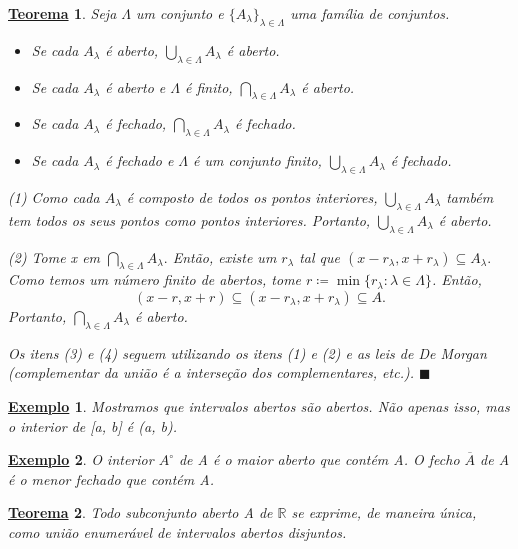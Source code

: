 \documentclass{article}
\newtheorem*{theorem*}{\underline{Teorema}}
\newtheorem{example}{\underline{Exemplo}}
\renewcommand\qedsymbol{$\blacksquare$}
\begin{document}
\begin{theorem*}
  Seja $\Lambda $ um conjunto e $\{A_{\lambda }\}_{\lambda \in\Lambda } $ uma fam\'ilia de conjuntos.
 \begin{itemize}
  \item[1)] Se cada $A_{\lambda }$ \'e aberto, $\bigcup_{\lambda\in\Lambda  }^{}{A_{\lambda }}$ \'e aberto.
  \item[2)] Se cada $A_{\lambda }$ \'e aberto e $\Lambda $ \'e finito, $\bigcap_{\lambda \in\Lambda }^{}{A_{\lambda }}$
    \'e aberto.
  \item[3)] Se cada $A_{\lambda }$ \'e fechado, $\bigcap_{\lambda \in\Lambda }^{}{A_{\lambda }}$ \'e fechado.
  \item[4)] Se cada $A_{\lambda }$ \'e fechado e $\Lambda $ \'e um conjunto finito, $\bigcup_{\lambda \in\Lambda }^{}{A_{\lambda }}$
    \'e fechado.
 \end{itemize}
 (1) Como cada $A_{\lambda }$ \'e composto de todos os pontos interiores, $\bigcup_{\lambda \in\Lambda }^{}{A_{\lambda }}$ tamb\'em tem
 todos os seus pontos como pontos interiores. Portanto, $\bigcup_{\lambda \in\Lambda }^{}{A_{\lambda }}$ \'e aberto.

 (2) Tome x em $\bigcap_{\lambda \in\Lambda }^{}{A_{\lambda }}.$ Ent\~ao, existe um $r_{\lambda }$ tal que $(x-r_{\lambda }, x+r_{\lambda })\subseteq{A_{\lambda }}.$
 Como temos um n\'umero finito de abertos, tome $r\coloneqq \min{\{r_{\lambda }:\lambda \in\Lambda \}}$. Ent\~ao, 
   $$
   (x-r, x+r)\subseteq{(x-r_{\lambda },x+r_{\lambda })}\subseteq{A}.
   $$
   Portanto, $\bigcap_{\lambda \in\Lambda }^{}{A_{\lambda }}$ \'e aberto.

  Os itens (3) e (4) seguem utilizando os itens (1) e (2) e as leis de De Morgan (complementar da uni\~ao \'e a interse\c c\~ao dos complementares, etc.). \qedsymbol
\end{theorem*}
\begin{example}
  Mostramos que intervalos abertos s\~ao abertos. N\~ao apenas isso, mas o interior de [a, b] \'e (a, b).
\end{example}
\begin{example}
  O interior $A^{\circ}$ de A \'e o maior aberto que cont\'em A. O fecho $\overline{A}$ de A \'e o menor fechado que cont\'em A.
\end{example}
\begin{theorem*}
  Todo subconjunto aberto A de $\mathbb{R}$ se exprime, de maneira \'unica, como uni\~ao enumer\'avel de intervalos abertos disjuntos.
\end{theorem*}
\end{document}
